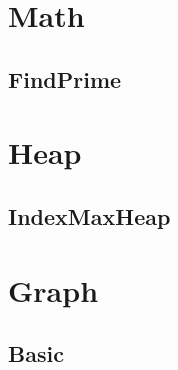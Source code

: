 \section{Math}
    \subsection{FindPrime}
        

\section{Heap}
    \subsection{IndexMaxHeap}
        

\section{Graph}
    \subsection{Basic}
        